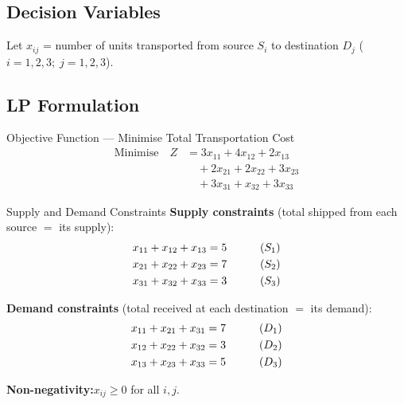 \documentclass[12pt]{article}
\begin{document}
\vspace{8pt}

\subsection*{Decision Variables}

Let $x_{ij}$ = number of units transported from source $S_i$ to destination $D_j$\; ($i=1,2,3;\; j=1,2,3$).

\vspace{8pt}

\subsection*{LP Formulation}

\begin{stepbox}{Objective Function --- Minimise Total Transportation Cost}
\vspace{4pt}
\begin{align*}
\text{Minimise}\quad Z
  &= 3x_{11} + 4x_{12} + 2x_{13} \\
  &\quad + 2x_{21} + 2x_{22} + 3x_{23} \\
  &\quad + 3x_{31} + x_{32} + 3x_{33}
\end{align*}
\end{stepbox}

\vspace{8pt}

\begin{stepbox}{Supply and Demand Constraints}
\textbf{Supply constraints} (total shipped from each source $=$ its supply):
\begin{alignat}{2}
  x_{11} + x_{12} + x_{13} &= 5 \qquad &&(S_1) \notag\\
  x_{21} + x_{22} + x_{23} &= 7 \qquad &&(S_2) \notag\\
  x_{31} + x_{32} + x_{33} &= 3 \qquad &&(S_3) \notag
\end{alignat}

\textbf{Demand constraints} (total received at each destination $=$ its demand):
\begin{alignat}{2}
  x_{11} + x_{21} + x_{31} &= 7 \qquad &&(D_1) \notag\\
  x_{12} + x_{22} + x_{32} &= 3 \qquad &&(D_2) \notag\\
  x_{13} + x_{23} + x_{33} &= 5 \qquad &&(D_3) \notag
\end{alignat}

\textbf{Non-negativity:}\quad $x_{ij} \geq 0$ for all $i,j$.
\end{stepbox}
\end{document}
